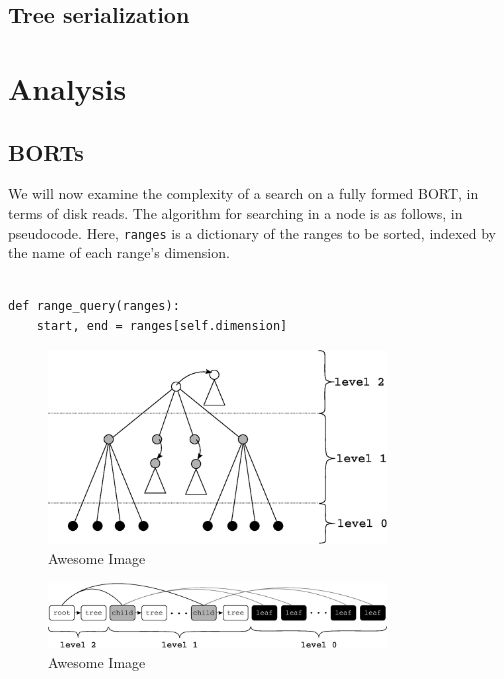 \documentclass[11pt, oneside]{article}
\begin{document}
\subsection{Tree serialization}

\section{Analysis}

\subsection{BORTs}

We will now examine the complexity of a search on a fully formed BORT, in terms
of disk reads. The algorithm for searching in a node is as follows, in
pseudocode. Here, \texttt{ranges} is a dictionary of the ranges to be sorted,
indexed by the name of each range's dimension.

\begin{verbatim}

def range_query(ranges):
    start, end = ranges[self.dimension]

\end{verbatim}

\begin{figure}[p]
    \centering
    \includegraphics[width=0.8\textwidth]{fig1.eps}
    \caption{Awesome Image}
\end{figure}
\begin{figure}[p]
    \centering
    \includegraphics[width=0.8\textwidth]{fig2.eps}
    \caption{Awesome Image}
\end{figure}
\end{document}
